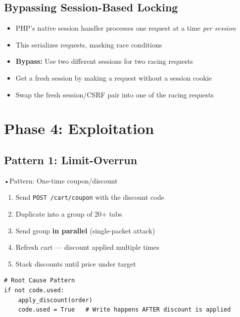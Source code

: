 \documentclass[11pt]{article}
\begin{document}
\subsection{Bypassing Session-Based Locking}

\begin{techniquebox}
\begin{itemize}
    \item PHP's native session handler processes one request at a time \emph{per session}
    \item This serializes requests, masking race conditions
    \item \textbf{Bypass:} Use two different sessions for two racing requests
    \item Get a fresh session by making a request without a session cookie
    \item Swap the fresh session/CSRF pair into one of the racing requests
\end{itemize}
\end{techniquebox}

\section{Phase 4: Exploitation}

\subsection{Pattern 1: Limit-Overrun}

\begin{labbox}\textsc{•}{Pattern: One-time coupon/discount}
\begin{enumerate}
    \item Send \texttt{POST /cart/coupon} with the discount code
    \item Duplicate into a group of 20+ tabs
    \item Send group \textbf{in parallel} (single-packet attack)
    \item Refresh cart — discount applied multiple times
    \item Stack discounts until price under target
\end{enumerate}
\end{labbox}

\begin{lstlisting}[style=code]
# Root Cause Pattern
if not code.used:
    apply_discount(order)
    code.used = True   # Write happens AFTER discount is applied
\end{lstlisting}
\end{document}
